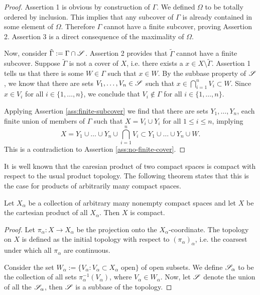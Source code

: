 \begin{appendices}
\begin{proof}
Assertion 1 is obvious by construction of $\Gamma$. We defined $\Omega$ to be totally ordered by inclusion. This implies that any subcover of $\Gamma$ is already contained in some element of $\Omega$. Therefore $\Gamma$ cannot have a finite subcover, proving Assertion 2.
Assertion 3 is a direct consequence of the maximality of $\Omega$.	

Now, consider $\tilde{\Gamma}:=\Gamma\cap\mathscr{S}$. Assertion 2 provides that $\tilde{\Gamma}$ cannot have a finite subcover. 
Suppose $\tilde{\Gamma}$ is not a cover of $X$, i.e. there exists a $x\in X\setminus\tilde{\Gamma}$. Assertion 1 tells us that there is some $W\in \Gamma$ such that $x\in W$. By the subbase property of $\mathscr{S}$, we know that there are sets $V_1,\dots,V_n\in \mathscr{S}$ such that $x\in\bigcap\limits_{i=1}^n V_i\subset W$. Since $x\in V_i$ for all $i\in\{1,\dots,n\}$, we conclude that $V_i\not\in\Gamma$ for all $i\in\{1,\dots,n\}$.


Applying Assertion \ref{ass:finite-subcover} we find that there are sets $Y_1,\dots,Y_n$, each finite union of members of $\Gamma$ such that $X=V_i\cup Y_i$ for all $1\leq i\leq n$, implying
\[
X=Y_1\cup\dots\cup Y_n\cup \bigcap\limits_{i=1}^nV_i\subset Y_1\cup\dots\cup Y_n\cup W.
\]
This is a contradiction to Assertion \ref{ass:no-finite-cover}.
\end{proof}


It is well known that the caresian product of two compact spaces is compact with respect to the usual product topology. The following theorem \cite[see][]{rudin:functional-analysis} states that this is the case for products of arbitrarily many compact spaces.
\begin{theorem}\label{thm:tychonoff}
	Let $X_\alpha$ be a collection of arbitrary many nonempty compact spaces and let $X$ be the cartesian product of all $X_\alpha$. Then $X$ is compact.
\end{theorem}

\begin{proof}
	Let $\pi_\alpha: X\to X_\alpha$ be the projection onto the $X_\alpha$-coordinate. The topology on $X$ is defined as the initial topology with respect to $(\pi_\alpha)_\alpha$, i.e. the coarsest under which all $\pi_\alpha$ are continuous.
	
	Consider the set $W_\alpha:=\{V_\alpha\colon V_\alpha\subset X_\alpha \text{ open}\}$ of open subsets. We define $\mathscr{S}_\alpha$ to be the collection of all sets $\pi_\alpha^{-1}(V_\alpha)$, where $V_\alpha\in W_\alpha$. Now, let $\mathscr{S}$ denote the union of all the $\mathscr{S}_\alpha$, then $\mathscr{S}$ is a subbase of the topology. 
	

\end{proof}
\end{appendices}
